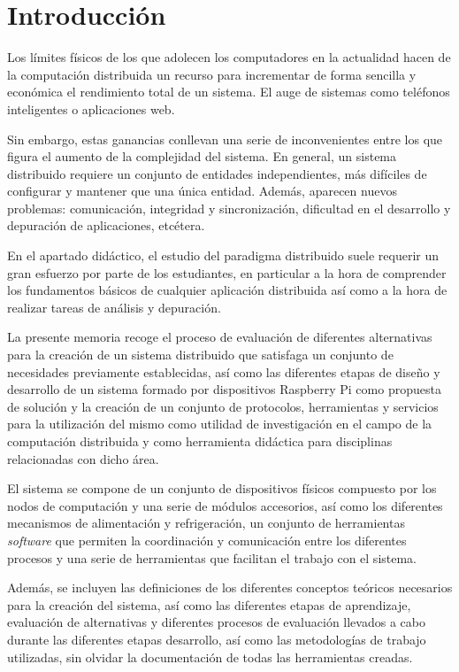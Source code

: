 \chapter{Introducción}

Los límites físicos de los que adolecen los computadores en la actualidad\cite{seth:physical} hacen de la computación distribuida un recurso para incrementar de forma sencilla y económica el rendimiento total de un sistema. El auge de sistemas como teléfonos inteligentes o aplicaciones web. 

Sin embargo, estas ganancias conllevan una serie de inconvenientes entre los que figura el aumento de la complejidad del sistema. En general, un sistema distribuido requiere un conjunto de entidades independientes, más difíciles de configurar y mantener que una única entidad. Además, aparecen nuevos problemas: comunicación, integridad y sincronización, dificultad en el desarrollo y depuración de aplicaciones, etcétera.

En el apartado didáctico, el estudio del paradigma distribuido suele requerir un gran esfuerzo por parte de los estudiantes, en particular a la hora de comprender los fundamentos básicos de cualquier aplicación distribuida así como a la hora de realizar tareas de análisis y depuración.

La presente memoria recoge el proceso de evaluación de diferentes alternativas para la creación de un sistema distribuido que satisfaga un conjunto de necesidades previamente establecidas, así como las diferentes etapas de diseño y desarrollo de un sistema formado por dispositivos Raspberry Pi como propuesta de solución y la creación de un conjunto de protocolos, herramientas y servicios para la utilización del mismo como utilidad de investigación en el campo de la computación distribuida y como herramienta didáctica para disciplinas relacionadas con dicho área.

El sistema se compone de un conjunto de dispositivos físicos compuesto por los nodos de computación y una serie de módulos accesorios, así como los diferentes mecanismos de alimentación y refrigeración, un conjunto de herramientas \textit{software} que permiten la coordinación y comunicación entre los diferentes procesos y una serie de herramientas que facilitan el trabajo con el sistema.

Además, se incluyen las definiciones de los diferentes conceptos teóricos necesarios para la creación del sistema, así como las diferentes etapas de aprendizaje, evaluación de alternativas y diferentes procesos de evaluación llevados a cabo durante las diferentes etapas desarrollo, así como las metodologías de trabajo utilizadas, sin olvidar la documentación de todas las herramientas creadas.